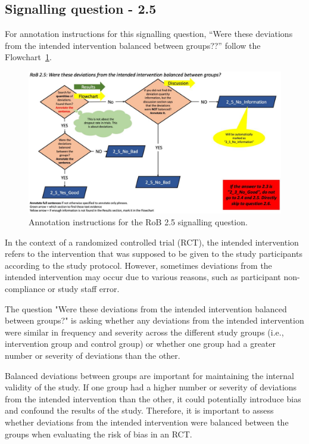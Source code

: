 \documentclass[sn-mathphys,Numbered]{sn-jnl}%
\begin{document}
\subsection*{Signalling question - 2.5 }
%
For annotation instructions for this signalling question, ``Were these deviations from the intended intervention balanced between groups??'' follow the Flowchart~\ref{fig:2_5}.
%
\begin{figure}[hbt]
    \centering
    \includegraphics[width=\textwidth]{figures/2_5.jpg}
    \caption{Annotation instructions for the RoB 2.5 signalling question.}
    \label{fig:2_5}
\end{figure}
%
In the context of a randomized controlled trial (RCT), the intended intervention refers to the intervention that was supposed to be given to the study participants according to the study protocol. However, sometimes deviations from the intended intervention may occur due to various reasons, such as participant non-compliance or study staff error.

The question "Were these deviations from the intended intervention balanced between groups?" is asking whether any deviations from the intended intervention were similar in frequency and severity across the different study groups (i.e., intervention group and control group) or whether one group had a greater number or severity of deviations than the other.

Balanced deviations between groups are important for maintaining the internal validity of the study. If one group had a higher number or severity of deviations from the intended intervention than the other, it could potentially introduce bias and confound the results of the study. Therefore, it is important to assess whether deviations from the intended intervention were balanced between the groups when evaluating the risk of bias in an RCT.
\end{document}
